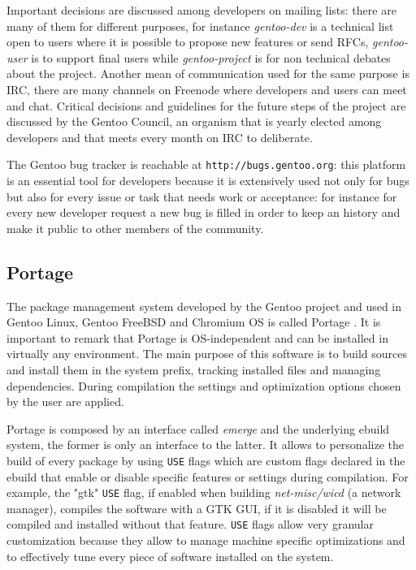 Important decisions are discussed among developers on mailing lists: there are many of them for different purposes, for instance \emph{gentoo-dev} is a technical list open to users where it is possible to propose new features or send RFCs, \emph{gentoo-user} is to support final users while \emph{gentoo-project} is for non technical debates about the project. Another mean of communication used for the same purpose is IRC, there are many channels on Freenode \cite{gentoo_irc} where developers and users can meet and chat.
Critical decisions and guidelines for the future steps of the project are discussed by the Gentoo Council, an organism that is yearly elected among developers and that meets every month on IRC to deliberate.

The Gentoo bug tracker is reachable at \texttt{http://bugs.gentoo.org}: this platform is an essential tool for developers because it is extensively used not only for bugs but also for every issue or task that needs work or acceptance: for instance for every new developer request a new bug is filled in order to keep an history and make it public to other members of the community.


\subsection{Portage}
The package management system developed by the Gentoo project and used in Gentoo Linux, Gentoo FreeBSD and Chromium OS is called Portage \cite{gentoo_portage}. It is important to remark that Portage is OS-independent and can be installed in virtually any environment.
The main purpose of this software is to build sources and install them in the system prefix, tracking installed files and managing dependencies. During compilation the settings and optimization options chosen by the user are applied.

Portage is composed by an interface called \emph{emerge} and the underlying ebuild system, the former is only an interface to the latter. It allows to personalize the build of every package by using \texttt{USE} flags which are custom flags declared in the ebuild that enable or disable specific features or settings during compilation. For example, the "gtk" \texttt{USE} flag, if enabled when building \emph{net-misc/wicd} (a network manager), compiles the software with a GTK GUI, if it is disabled it will be compiled and installed without that feature. \texttt{USE} flags allow very granular customization because they allow to manage machine specific optimizations and to effectively tune every piece of software installed on the system.

